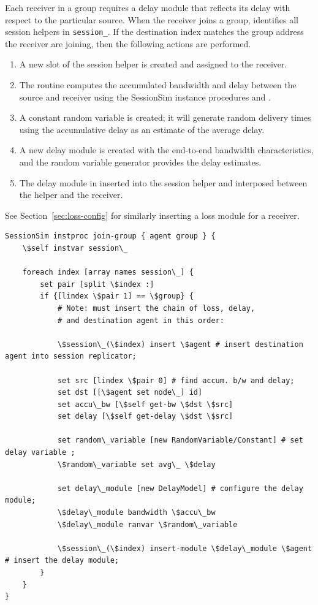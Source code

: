 Each receiver in a group requires a delay module that
reflects its delay with respect to the particular source.
When the receiver joins a group, 
 identifies all session helpers in {\tt session\_}.
If the destination index matches the group address
the receiver are joining, then the following actions are performed.
\begin{enumerate}
\item A new slot of the session helper is created and assigned to the receiver.
\item The routine computes the accumulated bandwidth and delay
  between the source and receiver using the SessionSim instance procedures
   and .
\item A constant random variable is created; it will generate random delivery
  times using the accumulative delay as an estimate of the average delay.
\item A new delay module is created with the end-to-end bandwidth
  characteristics, and the random variable generator provides the delay
  estimates.
\item The delay module in inserted into the session helper and interposed
  between the helper and the receiver.
\end{enumerate}
See Section~\ref{sec:loss-config} for similarly
inserting a loss module for a receiver.

\begin{verbatim}
SessionSim instproc join-group { agent group } {
    \$self instvar session\_

    foreach index [array names session\_] {
        set pair [split \$index :]
        if {[lindex \$pair 1] == \$group} {
            # Note: must insert the chain of loss, delay, 
            # and destination agent in this order:

            \$session\_(\$index) insert \$agent # insert destination agent into session replicator;

            set src [lindex \$pair 0] # find accum. b/w and delay;
            set dst [[\$agent set node\_] id]
            set accu\_bw [\$self get-bw \$dst \$src]
            set delay [\$self get-delay \$dst \$src]

            set random\_variable [new RandomVariable/Constant] # set delay variable ;
            \$random\_variable set avg\_ \$delay

            set delay\_module [new DelayModel] # configure the delay module;
            \$delay\_module bandwidth \$accu\_bw
            \$delay\_module ranvar \$random\_variable

            \$session\_(\$index) insert-module \$delay\_module \$agent # insert the delay module;
        }
    }
}
\end{verbatim}



